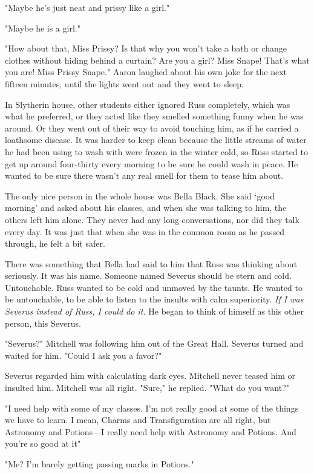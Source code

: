 "Maybe he's just neat and prissy like a girl."

"Maybe he is a girl."

"How about that, Miss Prissy? Is that why you won't take a bath or change clothes without hiding behind a curtain? Are you a girl? Miss Snape! That's what you are! Miss Prissy Snape." Aaron laughed about his own joke for the next fifteen minutes, until the lights went out and they went to sleep.

In Slytherin house, other students either ignored Russ completely, which was what he preferred, or they acted like they smelled something funny when he was around. Or they went out of their way to avoid touching him, as if he carried a loathsome disease. It was harder to keep clean because the little streams of water he had been using to wash with were frozen in the winter cold, so Russ started to get up around four-thirty every morning to be sure he could wash in peace. He wanted to be sure there wasn't any real smell for them to tease him about.

The only nice person in the whole house was Bella Black. She said `good morning' and asked about his classes, and when she was talking to him, the others left him alone. They never had any long conversations, nor did they talk every day. It was just that when she was in the common room as he passed through, he felt a bit safer.

There was something that Bella had said to him that Russ was thinking about seriously. It was his name. Someone named Severus should be stern and cold. Untouchable. Russ wanted to be cold and unmoved by the taunts. He wanted to be untouchable, to be able to listen to the insults with calm superiority. \emph{If I was Severus instead of Russ, I could do it.} He began to think of himself as this other person, this Severus.

"Severus?" Mitchell was following him out of the Great Hall. Severus turned and waited for him. "Could I ask you a favor?"

Severus regarded him with calculating dark eyes. Mitchell never teased him or insulted him. Mitchell was all right. "Sure," he replied. "What do you want?"

"I need help with some of my classes. I'm not really good at some of the things we have to learn. I mean, Charms and Transfiguration are all right, but Astronomy and Potions—I really need help with Astronomy and Potions. And you're so good at it{\el}"

"Me? I'm barely getting passing marks in Potions."

